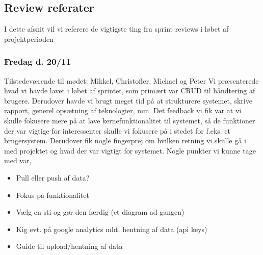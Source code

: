 \subsection{Review referater}
I dette afsnit vil vi referere de vigtigste ting fra sprint reviews i løbet af projektperioden
\subsubsection{Fredag d. 20/11}
Tilstedeværende til mødet: Mikkel, Christoffer, Michael og Peter
Vi præsenterede hvad vi havde lavet i løbet af sprintet, som primært var CRUD til håndtering af brugere. Derudover havde vi brugt meget tid på at strukturere systemet, skrive rapport, generel opsætning af teknologier, mm.
Det feedback vi fik var at vi skulle fokusere mere på at lave kernefunktionalitet til systemet, så de funktioner der var vigtige for interessenter skulle vi fokusere på i stedet for f.eks. et brugersystem.
Derudover fik nogle fingerprej om hvilken retning vi skulle gå i med projektet og hvad der var vigtigt for systemet.
Nogle punkter vi kunne tage med var,
\begin{itemize}
    \item{Pull eller push af data?}
    \item{Fokus på funktionalitet}
    \item{Vælg en sti og gør den færdig (et diagram ad gangen)}
    \item{Kig evt. på google analytics mht. hentning af data (api keys)}
    \item{Guide til upload/hentning af data}
\end{itemize}
